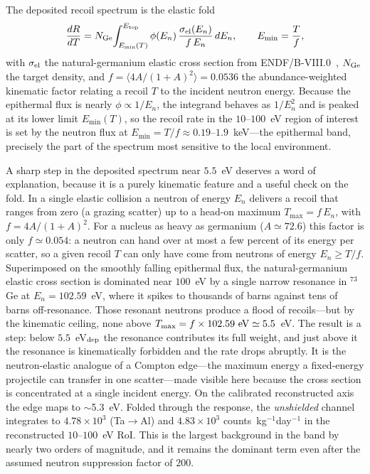 The deposited recoil spectrum is the elastic fold
\begin{equation}
\frac{dR}{dT}=N_{\rm Ge}\!\int_{E_{\min}(T)}^{E_{\rm top}}
\phi(E_n)\,\frac{\sigma_{\rm el}(E_n)}{f\,E_n}\,dE_n,
\qquad E_{\min}=\frac{T}{f},
\label{eq:neutronfold}
\end{equation}
with $\sigma_{\rm el}$ the natural-germanium elastic cross section from
ENDF/B-VIII.0~\cite{endfb8}, $N_{\rm Ge}$ the target density, and
$f=\langle 4A/(1+A)^2\rangle=0.0536$ the abundance-weighted kinematic
factor relating a recoil $T$ to the incident neutron energy. Because the
epithermal flux is nearly $\phi\propto1/E_n$, the integrand behaves as
$1/E_n^2$ and is peaked at its lower limit $E_{\min}(T)$, so the recoil rate
in the $10$--$100$~eV region of interest is set by the neutron flux at
$E_{\min}=T/f\approx0.19$--$1.9$~keV---the epithermal band, precisely the
part of the spectrum most sensitive to the local environment.

A sharp step in the deposited spectrum near $5.5$~eV deserves a word of
explanation, because it is a purely kinematic feature and a useful check on
the fold. In a single elastic collision a neutron of energy $E_n$ delivers a
recoil that ranges from zero (a grazing scatter) up to a head-on maximum
$T_{\max}=f\,E_n$, with $f=4A/(1+A)^2$. For a nucleus as heavy as germanium
($A\simeq72.6$) this factor is only $f\simeq0.054$: a neutron can hand over
at most a few percent of its energy per scatter, so a given recoil $T$ can
only have come from neutrons of energy $E_n\ge T/f$. Superimposed on the
smoothly falling epithermal flux, the natural-germanium elastic cross
section is dominated near $100$~eV by a single narrow resonance in $^{73}$Ge
at $E_n=102.59$~eV, where it spikes to thousands of barns against tens of
barns off-resonance. Those resonant neutrons produce a flood of recoils---but
by the kinematic ceiling, none above $T_{\max}=f\times102.59~{\rm eV}\simeq
5.5$~eV. The result is a step: below $5.5$~eV$_{\rm dep}$ the resonance
contributes its full weight, and just above it the resonance is
kinematically forbidden and the rate drops abruptly. It is the
neutron-elastic analogue of a Compton edge---the maximum energy a
fixed-energy projectile can transfer in one scatter---made visible here
because the cross section is concentrated at a single incident energy. On
the calibrated reconstructed axis the edge maps to $\sim$5.3~eV. Folded
through the
response, the \emph{unshielded} channel integrates to $4.78\times10^{3}$
(Ta$\to$Al) and $4.83\times10^{3}$ counts~kg$^{-1}$day$^{-1}$ in the
reconstructed $10$--$100$~eV RoI. This is the largest background in the
band by nearly two orders of magnitude, and it remains the dominant term
even after the assumed neutron suppression factor of $200$.

